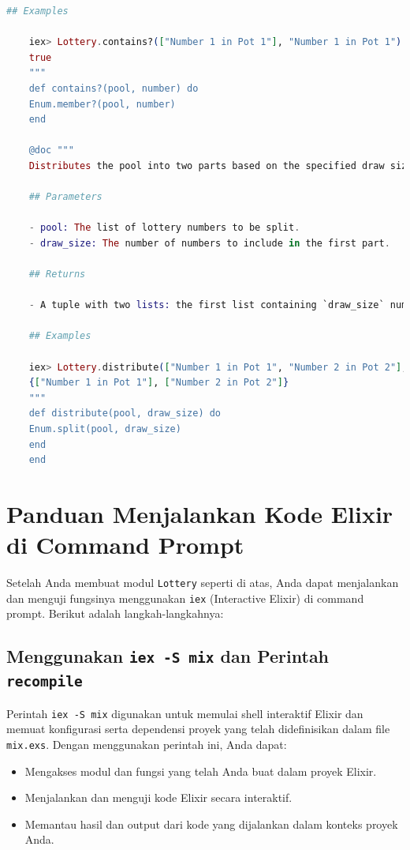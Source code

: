 \begin{lstlisting}[language=elixir, caption={Complete Lottery Module}]
	## Examples
	
	iex> Lottery.contains?(["Number 1 in Pot 1"], "Number 1 in Pot 1")
	true
	"""
	def contains?(pool, number) do
	Enum.member?(pool, number)
	end
	
	@doc """
	Distributes the pool into two parts based on the specified draw size.
	
	## Parameters
	
	- pool: The list of lottery numbers to be split.
	- draw_size: The number of numbers to include in the first part.
	
	## Returns
	
	- A tuple with two lists: the first list containing `draw_size` numbers, and the second list containing the remaining numbers.
	
	## Examples
	
	iex> Lottery.distribute(["Number 1 in Pot 1", "Number 2 in Pot 2"], 1)
	{["Number 1 in Pot 1"], ["Number 2 in Pot 2"]}
	"""
	def distribute(pool, draw_size) do
	Enum.split(pool, draw_size)
	end
	end
\end{lstlisting}

\section{Panduan Menjalankan Kode Elixir di Command Prompt}

Setelah Anda membuat modul \texttt{Lottery} seperti di atas, Anda dapat menjalankan dan menguji fungsinya menggunakan \texttt{iex} (Interactive Elixir) di command prompt. Berikut adalah langkah-langkahnya:

\subsection{Menggunakan \texttt{iex -S mix} dan Perintah \texttt{recompile}}

Perintah \texttt{iex -S mix} digunakan untuk memulai shell interaktif Elixir dan memuat konfigurasi serta dependensi proyek yang telah didefinisikan dalam file \texttt{mix.exs}. Dengan menggunakan perintah ini, Anda dapat:

\begin{itemize}
	\item Mengakses modul dan fungsi yang telah Anda buat dalam proyek Elixir.
	\item Menjalankan dan menguji kode Elixir secara interaktif.
	\item Memantau hasil dan output dari kode yang dijalankan dalam konteks proyek Anda.
\end{itemize}


